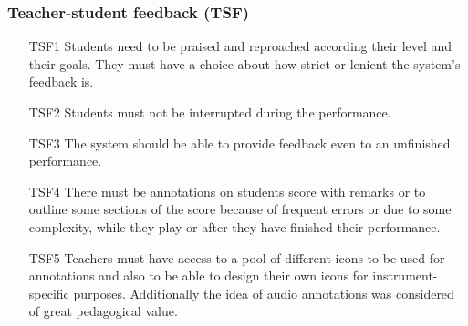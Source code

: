 
\subsubsection{Teacher-student feedback (TSF)}
\begin{itemize} \itemsep0em
\item[TSF1] Students need to be praised and reproached according their level and their goals. They must have a choice about how strict or lenient the system’s feedback is.
\item[TSF2] Students must not be interrupted during the performance.
\item[TSF3] The system should be able to provide feedback even to an unfinished performance.
\item[TSF4] There must be annotations on students score with remarks or to outline some sections of the score because of frequent errors or due to some complexity, while they play or after they have finished their performance.
\item[TSF5] Teachers must have access to a pool of different icons to be used for annotations and also to be able to design their own icons for instrument-specific purposes. Additionally the idea of audio annotations was considered of great pedagogical value.
\end{itemize}


